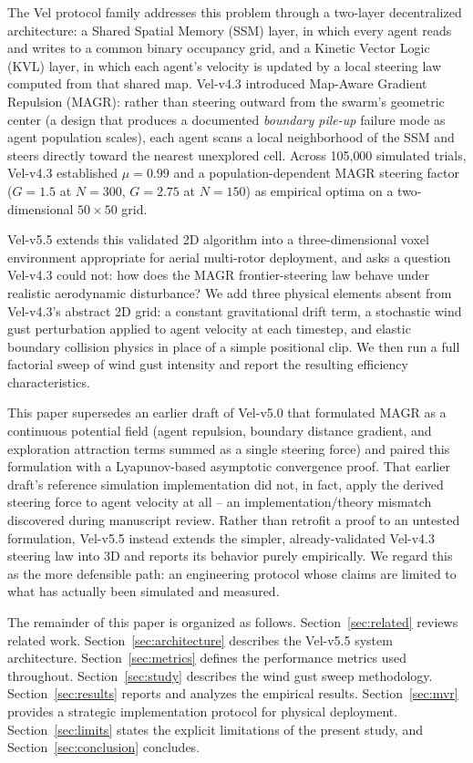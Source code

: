 \documentclass[10pt,journal]{IEEEtran}
\begin{document}
The Vel protocol family addresses this problem through a two-layer
decentralized architecture: a Shared Spatial Memory (SSM) layer, in which
every agent reads and writes to a common binary occupancy grid, and a
Kinetic Vector Logic (KVL) layer, in which each agent's velocity is updated
by a local steering law computed from that shared map. Vel-v4.3
\cite{velv43} introduced
Map-Aware Gradient Repulsion (MAGR): rather than steering outward from the
swarm's geometric center (a design that produces a documented
\textit{boundary pile-up} failure mode as agent population scales), each
agent scans a local neighborhood of the SSM and steers directly toward the
nearest unexplored cell. Across 105{,}000 simulated trials, Vel-v4.3
established $\mu=0.99$ and a population-dependent MAGR steering factor
($G=1.5$ at $N=300$, $G=2.75$ at $N=150$) as empirical optima on a
two-dimensional $50\times50$ grid.

Vel-v5.5 extends this validated 2D algorithm into a three-dimensional voxel
environment appropriate for aerial multi-rotor deployment, and asks a
question Vel-v4.3 could not: how does the MAGR frontier-steering law behave
under realistic aerodynamic disturbance? We add three physical elements
absent from Vel-v4.3's abstract 2D grid: a constant gravitational drift
term, a stochastic wind gust perturbation applied to agent velocity at each
timestep, and elastic boundary collision physics in place of a simple
positional clip. We then run a full factorial sweep of wind gust intensity
and report the resulting efficiency characteristics.

This paper supersedes an earlier draft of Vel-v5.0 that formulated MAGR as
a continuous potential field (agent repulsion, boundary distance gradient,
and exploration attraction terms summed as a single steering force) and
paired this formulation with a Lyapunov-based asymptotic convergence proof.
That earlier draft's reference simulation implementation did not, in fact,
apply the derived steering force to agent velocity at all -- an
implementation/theory mismatch discovered during manuscript review. Rather
than retrofit a proof to an untested formulation, Vel-v5.5 instead extends
the simpler, already-validated Vel-v4.3 steering law into 3D and reports
its behavior purely empirically. We regard this as the more defensible
path: an engineering protocol whose claims are limited to what has actually
been simulated and measured.

The remainder of this paper is organized as follows. Section~\ref{sec:related}
reviews related work. Section~\ref{sec:architecture} describes the Vel-v5.5
system architecture. Section~\ref{sec:metrics} defines the performance
metrics used throughout. Section~\ref{sec:study} describes the wind gust
sweep methodology. Section~\ref{sec:results} reports and analyzes the
empirical results. Section~\ref{sec:mvr} provides a strategic
implementation protocol for physical deployment. Section~\ref{sec:limits}
states the explicit limitations of the present study, and
Section~\ref{sec:conclusion} concludes.
\end{document}
